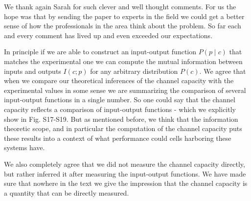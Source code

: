 We thank again Sarah for such clever and well thought comments. For us the hope
was that by sending the paper to experts in the field we could get a better
sense of how the professionals in the area think about the problem. So far each
and every comment has lived up and even exceeded our expectations.

In principle if we are able to construct an input-output function $P(p \mid c)$
that matches the experimental one we can compute the mutual information between
inputs and outputs $I(c; p)$ for any arbitrary distribution $P(c)$. We agree
that when we compare our theoretical inferences of the channel capacity with the
experimental values in some sense we are summarizing the comparison of several
input-output functions in a single number. So one could say that the channel
capacity reflects a comparison of input-output functions - which we explicitly
show in Fig. S17-S19. But as mentioned before, we think that the information
theoretic scope, and in particular the computation of the channel capacity puts
these results into a context of what performance could cells harboring these
systems have.

We also completely agree that we did not measure the channel capacity directly,
but rather inferred it after measuring the input-output functions. We have made
sure that nowhere in the text we give the impression that the channel capacity
is a quantity that can be directly measured.
